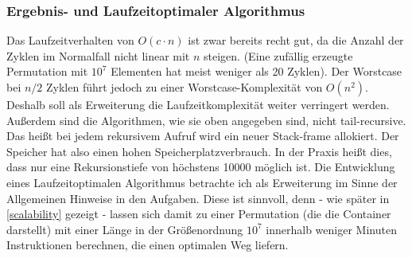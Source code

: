 \subsubsection{Ergebnis- und Laufzeitoptimaler Algorithmus} %
Das Laufzeitverhalten von $O(c \cdot n)$ ist zwar bereits recht gut, da die Anzahl der Zyklen im Normalfall nicht linear mit $n$ steigen.
(Eine zufällig erzeugte Permutation mit $10^7$ Elementen hat meist weniger als 20 Zyklen).
Der Worstcase bei $n/2$ Zyklen führt jedoch zu einer Worstcase-Komplexität von $O(n^2)$. \\
Deshalb soll als Erweiterung die Laufzeitkomplexität weiter verringert werden. \\
Außerdem sind die Algorithmen, wie sie oben angegeben sind, nicht tail-recursive.
Das heißt bei jedem rekursivem Aufruf wird ein neuer Stack-frame allokiert.
Der Speicher hat also einen hohen Speicherplatzverbrauch.
In der Praxis heißt dies, dass nur eine Rekursionstiefe von höchstens 10000 möglich ist.
Die Entwicklung eines Laufzeitoptimalen Algorithmus betrachte ich als Erweiterung im Sinne der Allgemeinen Hinweise in den Aufgaben.
Diese ist sinnvoll, denn - wie später in \ref{scalability} gezeigt -
lassen sich damit zu einer Permutation (die die Container darstellt)
mit einer Länge in der Größenordnung $10^7$ innerhalb weniger Minuten Instruktionen berechnen, die einen optimalen Weg liefern.

